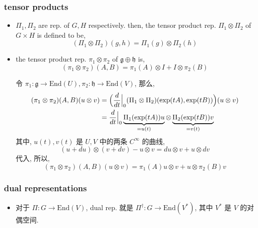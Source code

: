 \subsubsection{tensor products}
\begin{itemize}
	\item $\Pi_1, \Pi_2$ are rep. of $G, H$ respectively. then, the tensor product rep. $\Pi_1 \otimes \Pi_2$ of $G \times H$ is defined to be,
	\begin{equation}
		(\Pi_1 \otimes \Pi_2)(g, h) = \Pi_1(g) \otimes \Pi_2(h)
	\end{equation}
	
	\item the tensor product rep. $\pi_1 \otimes \pi_2$ of $\mathfrak{g} \oplus \mathfrak{h}$ is,
	\begin{equation}
		(\pi_1 \otimes \pi_2)(A, B) = \pi_1(A) \otimes I + I \otimes \pi_2(B)
	\end{equation}
	
	\begin{tcolorbox}[title=proof:]
		令 $\pi_1 : \mathfrak{g} \rightarrow \mathrm{End}(U), \pi_2 : \mathfrak{h} \rightarrow \mathrm{End}(V)$, 那么,
		\begin{align}
			(\pi_1 \otimes \pi_2)(A, B)(u \otimes v) &= \Big( \frac{d}{dt} \Big|_0 (\Pi_1 \otimes \Pi_2)(\exp(t A), \exp(t B)) \Big) (u \otimes v) \notag \\
			&= \frac{d}{dt} \Big|_0 \underbrace{\Pi_1(\exp(t A)) u}_{= u(t)} \otimes \underbrace{\Pi_2(\exp(t B)) v}_{= v(t)}
		\end{align}
		其中, $u(t), v(t)$ 是 $U, V$ 中的两条 $C^\infty$ 的曲线,
		\begin{equation}
			(u + du) \otimes (v + dv) - u \otimes v = du \otimes v + u \otimes dv
		\end{equation}
		代入, 所以,
		\begin{equation}
			(\pi_1 \otimes \pi_2)(A, B)(u \otimes v) = \pi_1(A) u \otimes v + u \otimes \pi_2(B) v
		\end{equation}
	\end{tcolorbox}
\end{itemize}

\subsubsection{dual representations}
\begin{itemize}
	\item 对于 $\Pi : G \rightarrow \mathrm{End}(V)$, dual rep. 就是 $\Pi^\dag : G \rightarrow \mathrm{End}(V^*)$, 其中 $V^*$ 是 $V$ 的对偶空间.
\end{itemize}

